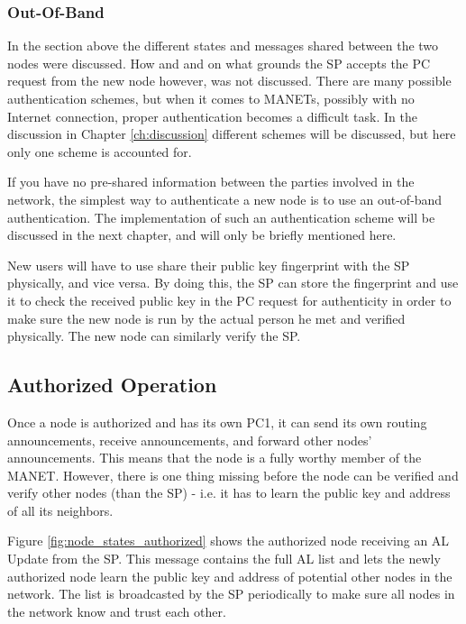 \subsubsection*{Out-Of-Band}
In the section above the different states and messages shared between the two
nodes were discussed. How and and on what grounds the \ac{SP} accepts the
\ac{PC} request from the new node however, was not discussed. There are many
possible authentication schemes, but when it comes to \acp{MANET}, possibly with
no Internet connection, proper authentication becomes a difficult task. In
the discussion in Chapter \ref{ch:discussion} different schemes will be
discussed, but here only one scheme is accounted for.

If you have no pre-shared information between the parties involved in the
network, the simplest way to authenticate a new node is to use an out-of-band
authentication. The implementation of such an authentication scheme will be
discussed in the next chapter, and will only be briefly mentioned here.

New users will have to use share their public key fingerprint with the \ac{SP}
physically, and vice versa. By doing this, the \ac{SP} can store the fingerprint
and use it to check the received public key in the \ac{PC} request for
authenticity in order to make sure the new node is run by the actual person he
met and verified physically. The new node can similarly verify the \ac{SP}.

\subsection{Authorized Operation}
Once a node is authorized and has its own \ac{PC1}, it can send its own routing
announcements, receive announcements, and forward other nodes' announcements.
This means that the node is a fully worthy member of the MANET. However, there
is one thing missing before the node can be verified and verify other nodes
(than the \ac{SP}) - i.e. it has to learn the public key and address of all its
neighbors.

Figure \ref{fig:node_states_authorized} shows the authorized node receiving
an \ac{AL} Update from the \ac{SP}. This message contains the full \ac{AL} list
and lets the newly authorized node learn the public key and address of potential
other nodes in the network. The list is broadcasted by the \ac{SP} periodically
to make sure all nodes in the network know and trust each other.

